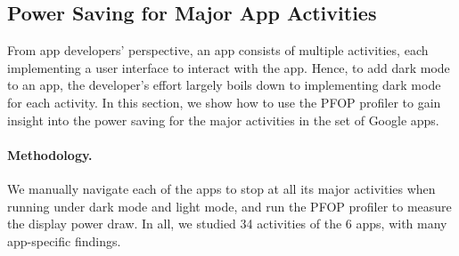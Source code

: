\subsection{Power Saving for Major App Activities}
\label{subsec:activities}




From app developers' perspective, an app consists of multiple
activities, each implementing a user interface to interact
with the app. Hence, to add dark mode to an app, the developer's
effort largely boils down to implementing dark mode for each
activity. In this section, we show how to use the PFOP profiler to
gain insight into the power saving for the major activities in the set of Google
apps.

\paragraph{Methodology.}
We manually navigate each of the apps to stop at all its major
activities when running under dark mode and light mode, and run
the PFOP profiler to measure the display power draw.
In all, we studied 34 activities of the 6 apps, with
many app-specific findings.

